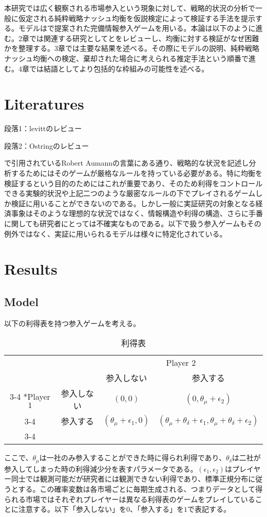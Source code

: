 \documentclass{jsarticle}
\begin{document}
本研究では広く観察される市場参入という現象に対して、戦略的状況の分析で一般に仮定される純粋戦略ナッシュ均衡を仮説検定によって検証する手法を提示する。モデルは\cite{2}で提案された完備情報参入ゲームを用いる。本論は以下のように進む。2章では関連する研究として\cite{11}と\cite{13}をレビューし、均衡に対する検証がなぜ困難かを整理する。3章では主要な結果を述べる。その際にモデルの説明、純粋戦略ナッシュ均衡への検定、棄却された場合に考えられる推定手法という順番で進む。4章では結語としてより包括的な枠組みの可能性を述べる。


\section{Literatures}
段落1：levittのレビュー

段落2：Ostringのレビュー

\cite{11}で引用されているRobert Aumannの言葉にある通り、戦略的な状況を記述し分析するためにはそのゲームが厳格なルールを持っている必要がある。特に均衡を検証するという目的のためにはこれが重要であり、そのため利得をコントロールできる実験的状況や上記二つのような厳密なルールの下でプレイされるゲームしか検証に用いることができないのである。しかし一般に実証研究の対象となる経済事象はそのような理想的な状況ではなく、情報構造や利得の構造、さらに手番に関しても研究者にとっては不確実なものである。以下で扱う参入ゲームもその例外ではなく、実証に用いられるモデルは様々に特定化されている。

\section{Results}
\subsection{Model}
以下の利得表を持つ参入ゲームを考える。
\begin{table}[h]
    \caption{利得表}
    \centering
    \setlength{\extrarowheight}{2pt}
    \begin{tabular}{cc|c|c|}
      & \multicolumn{1}{c}{} & \multicolumn{2}{c}{Player $2$}\\
      & \multicolumn{1}{c}{} & \multicolumn{1}{c}{参入しない}  & \multicolumn{1}{c}{参入する} \\\cline{3-4}
      \multirow{2}*{Player $1$}  & 参入しない & $(0,0)$ & $(0,\theta_{\mu}+\epsilon_2)$ \\\cline{3-4}
      & 参入する & $(\theta_{\mu}+\epsilon_1,0)$ & $(\theta_{\mu}+\theta_{\delta}+\epsilon_1, \theta_{\mu}+\theta_{\delta}+\epsilon_2)$ \\\cline{3-4}
    \end{tabular}
\end{table}
ここで、$\theta_{\mu}$は一社のみ参入することができた時に得られ利得であり、$\theta_{\delta}$は二社が参入してしまった時の利得減少分を表すパラメータである。$(\epsilon_1, \epsilon_2)$はプレイヤー同士では観測可能だが研究者には観測できない利得であり、標準正規分布に従うとする。この確率変数は各市場ごとに毎期生成される、つまりデータとして得られる市場ではそれぞれプレイヤーは異なる利得表のゲームをプレイしていることに注意する。以下「参入しない」を$0$、「参入する」を$1$で表記する。
\end{document}
